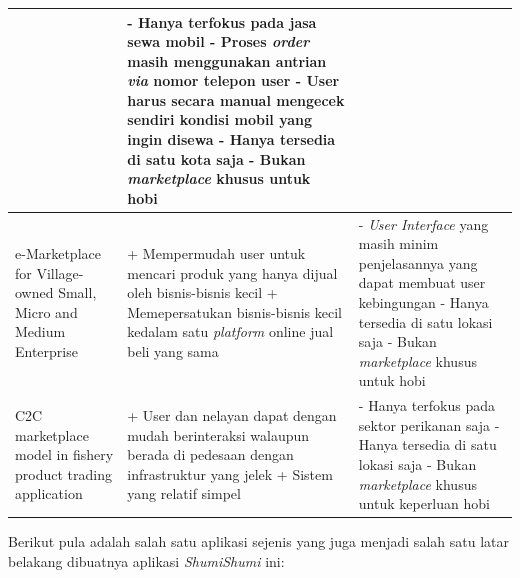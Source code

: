 \documentclass[a4paper]{article}
\begin{document}
\begin{centering}
\begin{longtable}{|p{3cm}|p{5cm}|p{5cm}|}
             & - Hanya terfokus pada jasa sewa mobil \newline
    - Proses \textit{order} masih menggunakan antrian \textit{via} nomor telepon user \newline
    - User harus secara manual mengecek sendiri kondisi mobil yang ingin disewa \newline
    - Hanya tersedia di satu kota saja \newline
    - Bukan \textit{marketplace} khusus untuk hobi                                                                                               \\
    \hline
    e-Marketplace for Village-owned Small, Micro and Medium Enterprise
             & + Mempermudah user untuk mencari produk yang hanya dijual oleh bisnis-bisnis kecil \newline
    + Memepersatukan bisnis-bisnis kecil kedalam satu \textit{platform} online jual beli yang sama \newline
             & - \textit{User Interface} yang masih minim penjelasannya yang dapat membuat user kebingungan \newline
    - Hanya tersedia di satu lokasi saja \newline
    - Bukan \textit{marketplace} khusus untuk hobi                                                                                               \\
    \hline
    C2C marketplace model in fishery product trading application
             & + User dan nelayan dapat dengan mudah berinteraksi walaupun berada di pedesaan dengan infrastruktur yang jelek \newline
    + Sistem yang relatif simpel \newline
             & - Hanya terfokus pada sektor perikanan saja \newline
    - Hanya tersedia di satu lokasi saja \newline
    - Bukan \textit{marketplace} khusus untuk keperluan hobi                                                                                     \\
    \hline
\end{longtable}
\end{centering}

Berikut pula adalah salah satu aplikasi sejenis yang juga menjadi salah satu latar belakang dibuatnya aplikasi \textit{ShumiShumi} ini:
\end{document}
